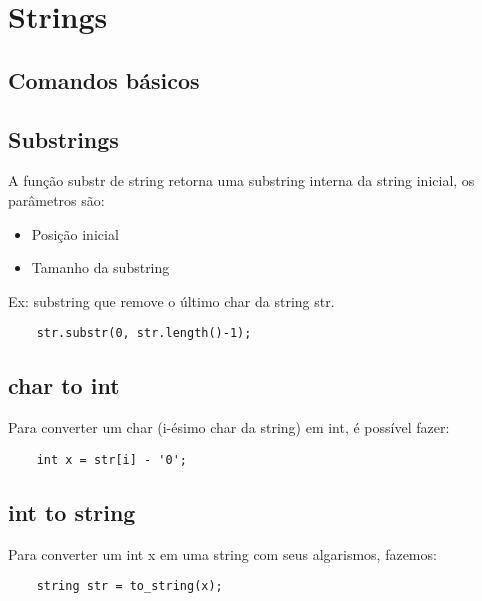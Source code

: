 \section{Strings}

\subsection{Comandos básicos}

\subsection{Substrings}

\par A função substr de string retorna uma substring interna da string inicial, os parâmetros são:
\begin{itemize}
    \item Posição inicial
    \item Tamanho da substring
\end{itemize}
\par Ex: substring que remove o último char da string str.
\begin{verbatim}
    str.substr(0, str.length()-1);
\end{verbatim}

\subsection{char to int}
\par Para converter um char (i-ésimo char da string) em int, é possível fazer:
\begin{verbatim}
    int x = str[i] - '0';
\end{verbatim}

\subsection{int to string}
\par Para converter um int x em uma string com seus algarismos, fazemos:
\begin{verbatim}
    string str = to_string(x);
\end{verbatim}

\pagebreak


